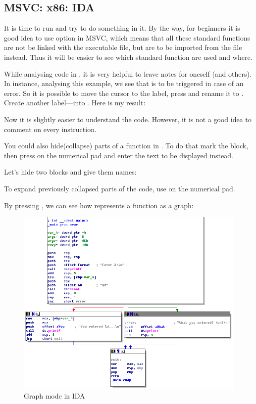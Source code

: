 \subsection{MSVC: x86: IDA}

It is time to run \IDA and try to do something in it.
By the way, for beginners it is good idea to use  option in MSVC, which means that all these
standard functions are not be linked with the executable file, 
but are to be imported from the  file instead.
Thus it will be easier to see which standard function are used and where.

While analysing code in \IDA, it is very helpful to leave notes for oneself (and others).
In instance, analysing this example, 
we see that  is to be triggered in case of an error.
So it is possible to move the cursor to the label, press  and rename it to .
Create another label---into .
Here is my result:



Now it is slightly easier to understand the code.
However, it is not a good idea to comment on every instruction.

You could also hide(collapse) parts of a function in \IDA.
To do that mark the block, then press \q{--} on the numerical pad and enter the text to be displayed instead.

Let's hide two blocks and give them names:



To expand previously collapsed parts of the code, use \q{+} on the numerical pad.

\clearpage
By pressing , we can see how \IDA represents a function as a graph:

\begin{figure}[H]
\centering
\includegraphics[scale=\FigScale]{patterns/04_scanf/3_checking_retval/IDA.png}
\caption{Graph mode in IDA}
\label{fig:ex3_IDA_1}
\end{figure}

